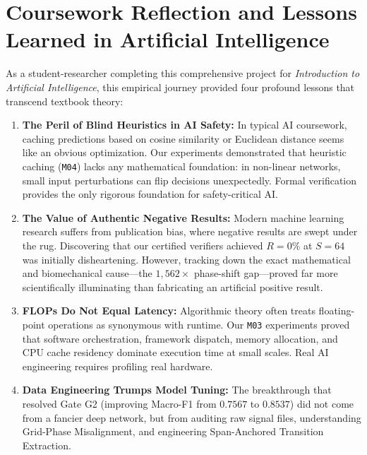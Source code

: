\documentclass[journal,onecolumn,10pt]{IEEEtran}
\newcommand{\code}[1]{{\small\ttfamily\nolinkurl{#1}}}
\theoremstyle{remark}
\begin{document}
\section{Coursework Reflection and Lessons Learned in Artificial Intelligence}
As a student-researcher completing this comprehensive project for \textit{Introduction to Artificial Intelligence}, this empirical journey provided four profound lessons that transcend textbook theory:

\begin{enumerate}[leftmargin=1.4em]
  \item \textbf{The Peril of Blind Heuristics in AI Safety:} In typical AI coursework, caching predictions based on cosine similarity or Euclidean distance seems like an obvious optimization. Our experiments demonstrated that heuristic caching (\code{M04}) lacks any mathematical foundation: in non-linear networks, small input perturbations can flip decisions unexpectedly. Formal verification provides the only rigorous foundation for safety-critical AI.
  \item \textbf{The Value of Authentic Negative Results:} Modern machine learning research suffers from publication bias, where negative results are swept under the rug. Discovering that our certified verifiers achieved $R = 0\%$ at $S=64$ was initially disheartening. However, tracking down the exact mathematical and biomechanical cause---the $1,562\times$ phase-shift gap---proved far more scientifically illuminating than fabricating an artificial positive result.
  \item \textbf{FLOPs Do Not Equal Latency:} Algorithmic theory often treats floating-point operations as synonymous with runtime. Our \code{M03} experiments proved that software orchestration, framework dispatch, memory allocation, and CPU cache residency dominate execution time at small scales. Real AI engineering requires profiling real hardware.
  \item \textbf{Data Engineering Trumps Model Tuning:} The breakthrough that resolved Gate G2 (improving Macro-F1 from $0.7567$ to $0.8537$) did not come from a fancier deep network, but from auditing raw signal files, understanding Grid-Phase Misalignment, and engineering Span-Anchored Transition Extraction.
\end{enumerate}

\end{document}
